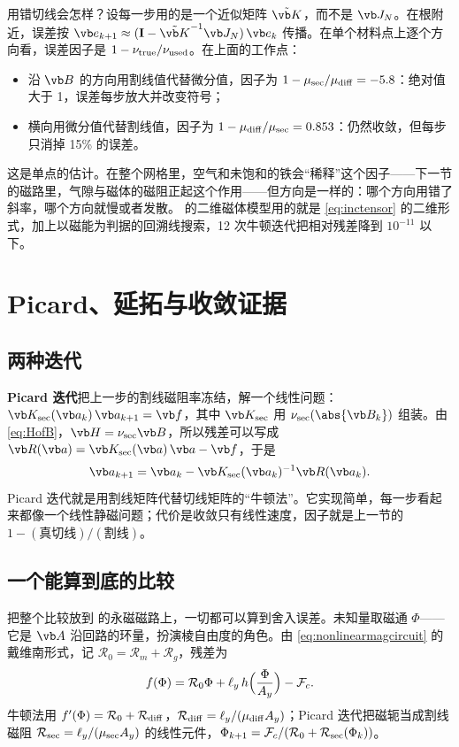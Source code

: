 用错切线会怎样？设每一步用的是一个近似矩阵 $\tilde{\vb K}$，而不是 $\vb J_N$。在根附近，误差按 $\vb e_{k+1}\approx(\mathbf I-\tilde{\vb K}^{-1}\vb J_N)\,\vb e_k$ 传播。在单个材料点上逐个方向看，误差因子是 $1-\nu_{\rm true}/\nu_{\rm used}$。在上面的工作点：
\begin{itemize}
\item 沿 $\vb B$ 的方向用割线值代替微分值，因子为 $1-\mu_{\rm sec}/\mu_{\rm diff}=-5.8$：绝对值大于 1，误差每步放大并改变符号；
\item 横向用微分值代替割线值，因子为 $1-\mu_{\rm diff}/\mu_{\rm sec}=0.853$：仍然收敛，但每步只消掉 15\% 的误差。
\end{itemize}
这是单点的估计。在整个网格里，空气和未饱和的铁会“稀释”这个因子——下一节的磁路里，气隙与磁体的磁阻正起这个作用——但方向是一样的：哪个方向用错了斜率，哪个方向就慢或者发散。 的二维磁体模型用的就是 \eqref{eq:inctensor} 的二维形式，加上以磁能为判据的回溯线搜索，12 次牛顿迭代把相对残差降到 $10^{-11}$ 以下。

\section{Picard、延拓与收敛证据}\label{sec:femvector-picard}

\subsection{两种迭代}
\textbf{Picard 迭代}把上一步的割线磁阻率冻结，解一个线性问题：$\vb K_{\rm sec}(\vb a_k)\,\vb a_{k+1}=\vb f$，其中 $\vb K_{\rm sec}$ 用 $\nu_{\rm sec}(\abs{\vb B_k})$ 组装。由 \eqref{eq:HofB}，$\vb H=\nu_{\rm sec}\vb B$，所以残差可以写成 $\vb R(\vb a)=\vb K_{\rm sec}(\vb a)\,\vb a-\vb f$，于是
\begin{equation*}
\vb a_{k+1}=\vb a_k-\vb K_{\rm sec}(\vb a_k)^{-1}\vb R(\vb a_k) .
\end{equation*}
Picard 迭代就是用割线矩阵代替切线矩阵的“牛顿法”。它实现简单，每一步看起来都像一个线性静磁问题；代价是收敛只有线性速度，因子就是上一节的 $1-(\text{真切线})/(\text{割线})$。

\subsection{一个能算到底的比较}
把整个比较放到 的永磁磁路上，一切都可以算到舍入误差。未知量取磁通 $\Phi$——它是 $\vb A$ 沿回路的环量，扮演棱自由度的角色。由 \eqref{eq:nonlinearmagcircuit} 的戴维南形式，记 $\mathcal R_0=\mathcal R_m+\mathcal R_g$，残差为
\begin{equation*}
f(\Phi)=\mathcal R_0\Phi+\ell_y\,h\Bigl(\frac{\Phi}{A_y}\Bigr)-\mathcal F_c .
\end{equation*}
牛顿法用 $f'(\Phi)=\mathcal R_0+\mathcal R_{\rm diff}$，$\mathcal R_{\rm diff}=\ell_y/(\mu_{\rm diff}A_y)$；Picard 迭代把磁轭当成割线磁阻 $\mathcal R_{\rm sec}=\ell_y/(\mu_{\rm sec}A_y)$ 的线性元件，$\Phi_{k+1}=\mathcal F_c/(\mathcal R_0+\mathcal R_{\rm sec}(\Phi_k))$。

